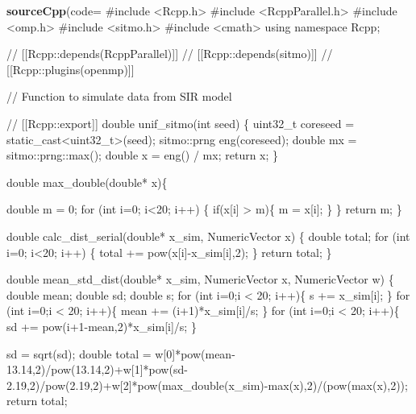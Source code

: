 \documentclass[
]{article}
\newenvironment{Shaded}{\begin{snugshade}}{\end{snugshade}}
\newcommand{\AttributeTok}[1]{\textcolor[rgb]{0.13,0.29,0.53}{#1}}
\newcommand{\FunctionTok}[1]{\textcolor[rgb]{0.13,0.29,0.53}{\textbf{#1}}}
\newcommand{\NormalTok}[1]{#1}
\newcommand{\StringTok}[1]{\textcolor[rgb]{0.31,0.60,0.02}{#1}}
\begin{document}
\begin{Shaded}
\begin{Highlighting}[]
\FunctionTok{sourceCpp}\NormalTok{(}\AttributeTok{code=}\StringTok{\textquotesingle{}}
\StringTok{\#include \textless{}Rcpp.h\textgreater{}}
\StringTok{\#include \textless{}RcppParallel.h\textgreater{}}
\StringTok{\#include \textless{}omp.h\textgreater{}}
\StringTok{\#include \textless{}sitmo.h\textgreater{}}
\StringTok{\#include \textless{}cmath\textgreater{}}
\StringTok{using namespace Rcpp;}

\StringTok{// [[Rcpp::depends(RcppParallel)]]}
\StringTok{// [[Rcpp::depends(sitmo)]]}
\StringTok{// [[Rcpp::plugins(openmp)]]}

\StringTok{// Function to simulate data from SIR model}

\StringTok{// [[Rcpp::export]]}
\StringTok{double unif\_sitmo(int seed) \{}
\StringTok{  uint32\_t coreseed = static\_cast\textless{}uint32\_t\textgreater{}(seed);}
\StringTok{  sitmo::prng eng(coreseed);}
\StringTok{  double mx = sitmo::prng::max();}
\StringTok{  double x = eng() / mx;}
\StringTok{  return x;}
\StringTok{\}}

\StringTok{double max\_double(double* x)\{}

\StringTok{  double m = 0;}
\StringTok{  for (int i=0; i\textless{}20; i++) \{}
\StringTok{    if(x[i] \textgreater{} m)\{}
\StringTok{      m = x[i];}
\StringTok{    \}}
\StringTok{  \}}
\StringTok{  return m;}
\StringTok{\}}

\StringTok{double calc\_dist\_serial(double* x\_sim, NumericVector x) \{}
\StringTok{  double total;}
\StringTok{  for (int i=0; i\textless{}20; i++) \{}
\StringTok{    total += pow(x[i]{-}x\_sim[i],2);}
\StringTok{  \}}
\StringTok{  return total;}
\StringTok{\}}

\StringTok{double mean\_std\_dist(double* x\_sim, NumericVector x, NumericVector w) \{}
\StringTok{  double mean;}
\StringTok{  double sd;}
\StringTok{  double s;}
\StringTok{  for (int i=0;i \textless{} 20; i++)\{}
\StringTok{    s += x\_sim[i];}
\StringTok{  \}}
\StringTok{  for (int i=0;i \textless{} 20; i++)\{}
\StringTok{    mean += (i+1)*x\_sim[i]/s;}
\StringTok{  \}}
\StringTok{  for (int i=0;i \textless{} 20; i++)\{}
\StringTok{    sd += pow(i+1{-}mean,2)*x\_sim[i]/s;}
\StringTok{  \}}

\StringTok{  sd = sqrt(sd);}
\StringTok{  }
\StringTok{  double total = w[0]*pow(mean{-}13.14,2)/pow(13.14,2)+w[1]*pow(sd{-}2.19,2)/pow(2.19,2)+w[2]*pow(max\_double(x\_sim){-}max(x),2)/(pow(max(x),2));}
\StringTok{  }
\StringTok{  return total;}


\end{Highlighting}
\end{Shaded}
\end{document}
